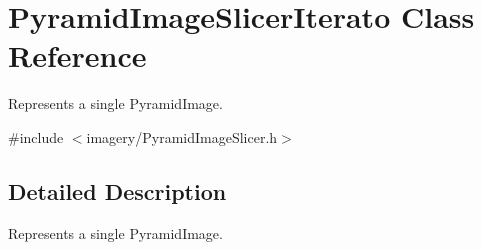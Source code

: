 \hypertarget{class_pyramid_image_slicer_iterato}{}\section{Pyramid\+Image\+Slicer\+Iterato Class Reference}
\label{class_pyramid_image_slicer_iterato}


Represents a single Pyramid\+Image.  




{\ttfamily \#include $<$imagery/\+Pyramid\+Image\+Slicer.\+h$>$}



\subsection{Detailed Description}
Represents a single Pyramid\+Image. 